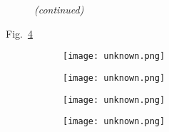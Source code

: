 \begin{figure}[htbp]
    \centering
    \hfill
    \caption[]{}\label{fig:add_label}
\end{figure}
\begin{figure}[htbp]
\ContinuedFloat
    \centering
    \hfill
    \captionsetup{list=no}
    \caption{\emph{(continued)}}
\end{figure}
Fig.~\ref{fig:add_label}
\begin{figure}
    \centering
    \begin{subfigure}[t]{\textwidth}
          \begin{minipage}[t]{0.49\linewidth}
            \centering
            \texttt{[image: unknown.png]}
          \end{minipage}
          \hfill
          \begin{minipage}[t]{0.49\linewidth}
            \centering
            \texttt{[image: unknown.png]}
          \end{minipage}
        \caption{}\label{fig:add_label}
    \end{subfigure}
    \par\bigskip
    \begin{subfigure}[t]{\textwidth}
          \begin{minipage}[t]{0.49\linewidth}
            \centering
            \texttt{[image: unknown.png]}
          \end{minipage}
          \hfill
          \begin{minipage}[t]{0.49\linewidth}
            \centering
            \texttt{[image: unknown.png]}
          \end{minipage}
        \caption{}\label{fig:add_label}
    \end{subfigure}
    \caption[]{}\label{fig:add_label}
\end{figure}

